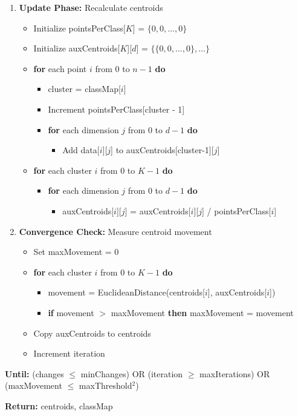 \documentclass[12pt,a4paper]{article}
\begin{document}
\begin{algorithm}[H]
\begin{flushleft}
\begin{enumerate}
    \item \textbf{Update Phase:} Recalculate centroids
    \begin{itemize}
        \item Initialize pointsPerClass[$K$] = $\{0, 0, \ldots, 0\}$
        \item Initialize auxCentroids[$K$][$d$] = $\{\{0, 0, \ldots, 0\}, \ldots\}$
        \item \textbf{for} each point $i$ from 0 to $n-1$ \textbf{do}
        \begin{itemize}
            \item cluster = classMap[$i$]
            \item Increment pointsPerClass[cluster - 1]
            \item \textbf{for} each dimension $j$ from 0 to $d-1$ \textbf{do}
            \begin{itemize}
                \item Add data[$i$][$j$] to auxCentroids[cluster-1][$j$]
            \end{itemize}
        \end{itemize}
        \item \textbf{for} each cluster $i$ from 0 to $K-1$ \textbf{do}
        \begin{itemize}
            \item \textbf{for} each dimension $j$ from 0 to $d-1$ \textbf{do}
            \begin{itemize}
                \item auxCentroids[$i$][$j$] = auxCentroids[$i$][$j$] / pointsPerClass[$i$]
            \end{itemize}
        \end{itemize}
    \end{itemize}

    \item \textbf{Convergence Check:} Measure centroid movement
    \begin{itemize}
        \item Set maxMovement = 0
        \item \textbf{for} each cluster $i$ from 0 to $K-1$ \textbf{do}
        \begin{itemize}
            \item movement = EuclideanDistance(centroids[$i$], auxCentroids[$i$])
            \item \textbf{if} movement $>$ maxMovement \textbf{then} maxMovement = movement
        \end{itemize}
        \item Copy auxCentroids to centroids
        \item Increment iteration
    \end{itemize}
\end{enumerate}

\textbf{Until:} (changes $\leq$ minChanges) OR (iteration $\geq$ maxIterations) OR (maxMovement $\leq$ maxThreshold$^2$)

\textbf{Return:} centroids, classMap
\end{flushleft}
\end{algorithm}
\end{document}
